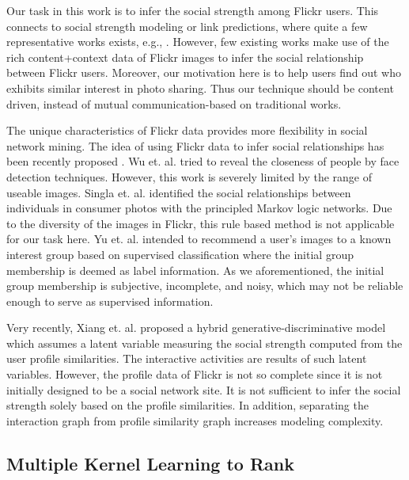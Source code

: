 Our task in this work is to infer the social strength among Flickr users. This connects to social strength modeling or link predictions, where quite a few
representative works exists, e.g., \cite{sn/AdamicA01,nips/TaskarWAK03,www/SinglaR08,chi/GilbertK09,www/XiangNR10,www/LeskovecHK10,www/ChoudhuryMHW10}. However,
few existing works make use of the rich content+context data of Flickr images to infer the social relationship between Flickr users. Moreover, our motivation
here is to help users find out who exhibits similar interest in photo sharing. Thus our technique should be content driven, instead of mutual
communication-based on traditional works.

The unique characteristics of Flickr data provides more flexibility in social network mining. The idea of using Flickr data to infer social relationships has
been recently proposed \cite{mm/WuT09, cvpr/SinglaKLG08, icmcs/YuJL09}. Wu et. al. \cite{mm/WuT09} tried to reveal the closeness of people by face detection
techniques. However, this work is severely limited by the range of useable images. Singla et. al. \cite{cvpr/SinglaKLG08} identified the social relationships
between individuals in consumer photos with the principled Markov logic networks. Due to the diversity of the images in Flickr, this rule based method is not
applicable for our task here. Yu et. al. \cite{icmcs/YuJL09} intended to recommend a user's images to a known interest group based on supervised classification
where the initial group membership is deemed as label information. As we aforementioned, the initial group membership is subjective, incomplete, and noisy,
which may not be reliable enough to serve as supervised information.

Very recently, Xiang et. al. proposed a hybrid generative-discriminative model which assumes a latent variable measuring the social strength computed from the
user profile similarities\cite{www/XiangNR10}. The interactive activities are results of such latent variables. However, the profile data of Flickr is not so
complete since it is not initially designed to be a social network site. It is not sufficient to infer the social strength solely based on the profile
similarities. In addition, separating the interaction graph from profile similarity graph increases modeling complexity.

\subsection{Multiple Kernel Learning to Rank}

